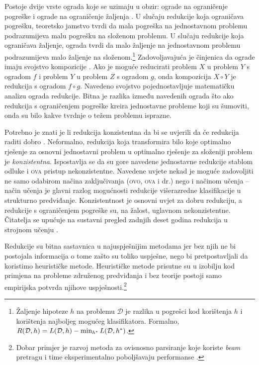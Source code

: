Postoje dvije vrste ograda koje se uzimaju u obzir: ograde na ograničenje
pogreške  i ograde na ograničenje žaljenja . U slučaju redukcije koja ograničava pogrešku, teoretsko jamstvo tvrdi
da mala pogreška na jednostavnom problemu podrazumijeva malu pogrešku na složenom
problemu. U slučaju redukcije koja ograničava žaljenje, ograda tvrdi da malo
žaljenje na jednostavnom problemu podrazumijeva malo žaljenje na
složenom.\footnote{Žaljenje hipoteze $h$ na problemu $\mathcal{D}$ je razlika u
pogrešci kod korištenja $h$ i korištenja najboljeg mogućeg klasifikatora.
Formalno, $R(\mathcal{D}, h) = L(\mathcal{D}, h) - \min_{h\ssymbol{1}}
L(\mathcal{D}, h\ssymbol{1})$.} Zadovoljavajuća je činjenica da ograde imaju
svojstvo kompozicije \citep{beygelzimer2005error}. Ako je moguće reducirati
problem $X$ u problem $Y$ s ogradom $f$ i problem $Y$ u problem $Z$ s ogradom
$g$, onda kompozicija $X \circ Y$ je redukcija s ogradom $f \circ g$. Navedeno
svojstvo pojednostavljuje matematičku analizu ograda redukcije. Bitna je razlika
između navedenih ograda što ako redukcija s ograničenjem pogreške kreira
jednostavne probleme koji su šumoviti, onda su bilo kakve tvrdnje o težem
problemu isprazne.

Potrebno je znati je li redukcija konzistentna  da bi se
uvjerili da će redukcija raditi dobro \citep{beygelzimer2009error,
daume15reductions}. Neformalno, redukcija koja transformira bilo koje optimalno
rješenje za osnovni jednostavni problem u optimalno rješenje za složeniji
problem je \textit{konzistentna}. Ispostavlja se da su gore navedene jednostavne
redukcije stablom odluke i \textsc{ova} pristup nekonzistentne. Navedene uvjete
nekad je moguće zadovoljiti ne samo odabirom načina zaključivanja (\textsc{ovo},
\textsc{ova} i dr.) nego i načinom učenja \citep{abe2004iterative,
beygelzimer2005weighted} -- način učenja je glavni razlog mogućnosti redukcije
višerazredne klasifikacije u strukturno predviđanje. Konzistentnost je osnovni
uvjet za dobru redukciju, a redukcije s ograničenjem pogreške su, na žalost,
uglavnom nekonzistentne. Čitatelja se upućuje na sustavni pregled zadnjih deset
godina redukcija u strojnom učenju \citep{daume15reductions}.

Redukcije su bitna sastavnica u najuspješnijim \lts{} metodama jer bez njih ne
bi postojala informacija o tome zašto su toliko uspješne, nego bi
pretpostavljali da koristimo heurističke metode. Heurističke metode prisutne su
u izobilju kod primjena na probleme združenog predviđanja i bez teorije postoji
samo empirijska potvrda njihove uspješnosti.\footnote{Dobar primjer je razvoj
metoda za ovisnosno parsiranje koje koriste \textit{beam} pretragu i time
eksperimentalno poboljšavaju performanse \citep{zhang2011transition,
bohnet2012transition}.}
